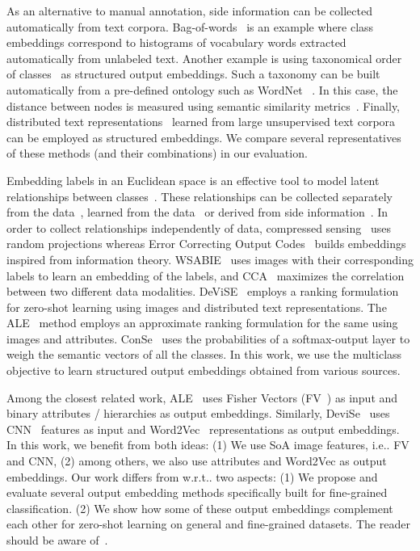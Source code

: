 \documentclass[10pt,twocolumn,letterpaper]{article}
\makeatletter
\DeclareRobustCommand\onedot{\futurelet\@let@token\@onedot}
\def\@onedot{\ifx\@let@token.\else.\null\fi\xspace}
\def\ie{{i.e}\onedot} \def\Ie{{I.e}\onedot}
\def\wrt{w.r.t\onedot} \def\dof{d.o.f\onedot}
\makeatother
\begin{document}
As an alternative to manual annotation, side information can be collected automatically from text corpora. Bag-of-words~\cite{H54} is an example where class embeddings correspond to histograms of vocabulary words extracted automatically from unlabeled text. Another example is using taxonomical order of classes~\cite{TJH05} as structured output embeddings. Such a taxonomy can be built automatically from a pre-defined ontology such as WordNet~\cite{WordNet,RSS10,APHS13} . In this case, the distance between nodes is measured using semantic similarity metrics~\cite{JC97, LC94, Lin98, Res95}. Finally, distributed text representations~\cite{MSCCD13, PSM14} learned from large unsupervised text corpora can be employed as structured embeddings. We compare several representatives of these methods (and their combinations) in our evaluation.

Embedding labels in an Euclidean space is an effective tool to model latent relationships between classes~\cite{BWG10}. These relationships can be collected separately from the data~\cite{HKL09, DB95}, learned from the data~\cite{WBU10,Hastie:Tibshirani:Friedman:2008} or derived from side information~\cite{FZ07, FCSBM13, APHS13, NMBSSFCD13}. In order to collect relationships independently of data, compressed sensing~\cite{HKL09} uses random projections whereas Error Correcting Output Codes~\cite{DB95} builds embeddings inspired from information theory. WSABIE~\cite{WBU10} uses images with their corresponding labels to learn an embedding of the labels, and CCA~\cite{Hastie:Tibshirani:Friedman:2008} maximizes the correlation between two different data modalities. DeViSE~\cite{FCSBM13} employs a ranking formulation for zero-shot learning using images and distributed text representations. The ALE~\cite{APHS13} method employs an approximate ranking formulation for the same using images and attributes. ConSe~\cite{NMBSSFCD13}  uses the probabilities of a softmax-output layer to weigh the semantic vectors of all the classes. 
In this work, we use the multiclass objective to learn structured output embeddings obtained from various sources.

Among the closest related work, ALE~\cite{APHS13} uses Fisher Vectors (FV~\cite{PD07}) as input and binary attributes / hierarchies as output embeddings. Similarly, DeviSe~\cite{FCSBM13} uses CNN~\cite{KSH12} features as input and Word2Vec~\cite{MSCCD13} representations as output embeddings. In this work, we benefit from both ideas: (1) We use SoA image features, \ie FV and CNN, (2) among others, we also use attributes and Word2Vec as output embeddings. Our work differs from \cite{FCSBM13} \wrt two aspects: (1) We propose and evaluate several output embedding methods specifically built for fine-grained classification. (2) We show how some of these output embeddings complement each other for zero-shot learning on general and fine-grained datasets. The reader should be aware of~\cite{APHS15}.
\end{document}

